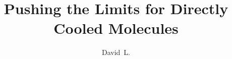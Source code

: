 \documentclass[defaultstyle,11pt]{thesis}
\title{Pushing the Limits for Directly Cooled Molecules}
\author{David~L.}{Reens}
\begin{document}










\nocite{*}		%

\appendix


\end{document}
